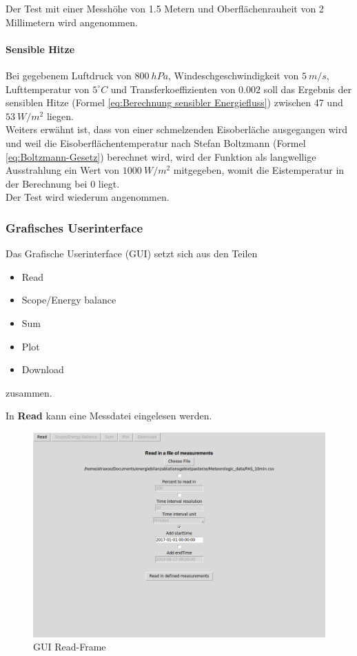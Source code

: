 \documentclass[12pt,a4paper]{article}
\begin{document}
Der Test mit einer Messhöhe von 1.5 Metern und Oberflächenrauheit von 2 Millimetern wird angenommen.

\paragraph{Sensible Hitze}
Bei gegebenem Luftdruck von $800~hPa$, Windeschgeschwindigkeit von $5~m/s$, Lufttemperatur von $5^\circ C$ und Transferkoeffizienten von $0.002$ soll das Ergebnis der sensiblen Hitze (Formel \ref{eq:Berechnung sensibler Energiefluss}) zwischen 47 und $53~W/m^2$ liegen. \\
Weiters erwähnt ist, dass von einer schmelzenden Eisoberläche ausgegangen wird und weil die Eisoberflächentemperatur nach Stefan Boltzmann (Formel \ref{eq:Boltzmann-Gesetz}) berechnet wird, wird der Funktion als langwellige Ausstrahlung ein Wert von $1000~W/m^2$ mitgegeben, womit die Eistemperatur in der Berechnung bei 0 liegt.\\

Der Test wird wiederum angenommen.

\subsubsection{Grafisches Userinterface}
Das Grafische Userinterface (GUI) setzt sich aus den Teilen 
\begin{itemize}
\item Read
\item Scope/Energy balance
\item Sum
\item Plot
\item Download
\end{itemize}
zusammen.

In \textbf{Read} kann eine Messdatei eingelesen werden. 

\begin{figure}[H]
\centering
\includegraphics[width=1\textwidth]{pictures/GUI/Read_Frame.png}
\caption{GUI Read-Frame}
\label{fig:GUI Read-Frame}
\end{figure}
\end{document}
